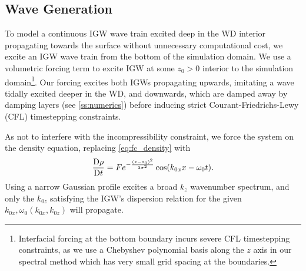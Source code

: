 \documentclass[twocolumn,
        nofootinbib, %
        usenames, %
        aps,
        prd,
        dvipsnames %
    ]{revtex4-1}%
\newcommand*{\md}[2]{\frac{\mathrm{D}#1}{\mathrm{D}#2}}
\DeclarePairedDelimiter\p{\lparen}{\rparen}
\begin{document}
\subsection{Wave Generation}

To model a continuous IGW wave train excited deep in the WD interior propagating
towards the surface without unnecessary computational cost, we excite an
IGW wave train from the bottom of the simulation domain. We use a volumetric
forcing term to excite IGW at some $z_0 > 0$ interior to the simulation
domain\footnote{Interfacial forcing at the bottom boundary incurs severe CFL
timestepping constraints, as we use a Chebyshev polynomial basis along the $z$
axis in our spectral method which has very small grid spacing at the
boundaries.}. Our forcing excites both IGWs propagating upwards, imitating a
wave tidally excited deeper in the WD, and downwards, which are damped away by
damping layers (see \autoref{ss:numerics}) before inducing strict
Courant-Friedrichs-Lewy (CFL) timestepping constraints.

As not to interfere with the incompressibility constraint, we force the system
on the density equation, replacing \autoref{eq:fc_density} with
\begin{equation}
    \md{\rho}{t} = Fe^{-\frac{(z - z_0)^2}{2\sigma^2}}
            \cos \p*{k_{0x}x - \omega_0 t}.\label{eq:vol_drive}
\end{equation}
Using a narrow Gaussian profile excites a broad $k_z$ wavenumber spectrum, and
only the $k_{0z}$ satisfying the IGW's dispersion relation for the given
$k_{0x}, \omega_0(k_{0x}, k_{0z})$ will propagate.
\end{document}
